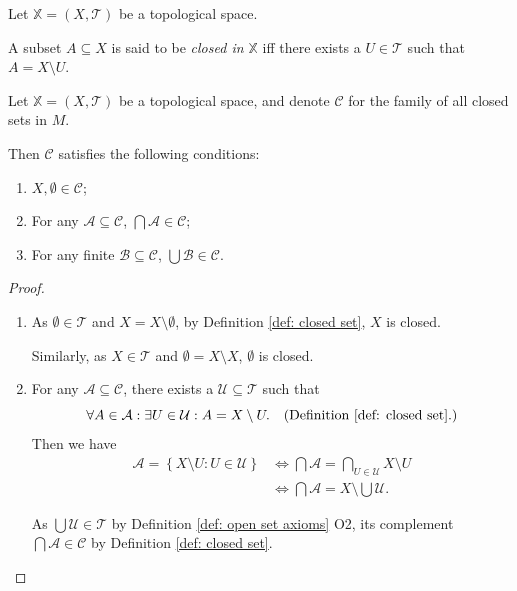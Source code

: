\begin{definition}
	\label{def: closed set}
	Let $\mathbb X = (X, \mathcal T)$ be a topological space.
	
	A subset $A \subseteq X$ is said to be \textit{closed in $\mathbb X$} iff there exists a $U \in \mathcal T$ such that $A = X \setminus U$.
\end{definition}


\begin{theorem}
	\label{thm: closed set axioms}
	Let $\mathbb X = (X, \mathcal T)$ be a topological space, and denote $\mathcal C$ for the family of all closed sets in $M$.
	
	Then $\mathcal C$ satisfies the following conditions:
	\begin{enumerate}[\bf C1.]
		\item $X, \emptyset \in \mathcal C$;
		\item For any $\mathcal A \subseteq \mathcal C$, $\bigcap \mathcal A \in \mathcal C$;
		\item For any finite $\mathcal B \subseteq \mathcal C$, $\bigcup \mathcal B \in \mathcal C$.
	\end{enumerate}
	
	\begin{proof}
		\begin{enumerate}[\bf C1.]
			\item
			As $\emptyset \in \mathcal T$ and $X = X \setminus \emptyset$, by Definition \ref{def: closed set}, $X$ is closed.
			
			Similarly, as $X \in \mathcal T$ and $\emptyset = X \setminus X$, $\emptyset$ is closed.
			
			\qedlm
			
			\item
			For any $\mathcal A \subseteq \mathcal C$, there exists a $\mathcal U \subseteq \mathcal T$ such that 
			$$
			\forall A \in \mathcal A: \exists U \in \mathcal U : A = X \setminus U. \quad
			\text{(Definition \ref{def: closed set}.)}
			$$
			Then we have
			$$
			\begin{aligned}
				\mathcal A = \left\{ X \setminus U : U \in \mathcal U \right\} &\iff \bigcap \mathcal A = \bigcap_{U \in \mathcal U} X \setminus U \\
				&\iff \bigcap \mathcal A = X \setminus \bigcup \mathcal U.
			\end{aligned}
			$$
			
			As $\bigcup \mathcal U \in \mathcal T$ by Definition \ref{def: open set axioms} O2, its complement $\bigcap \mathcal A \in \mathcal C$ by Definition \ref{def: closed set}.
				

\end{enumerate}
\end{proof}
\end{theorem}
